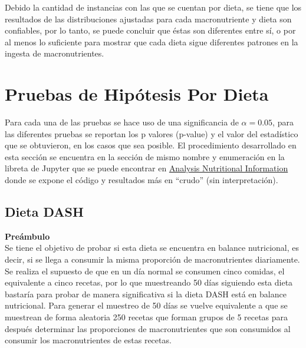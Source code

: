 \documentclass[12pt,a4paper]{article}
\begin{document}
        Debido la cantidad de instancias con las que se cuentan por dieta, se tiene que 
        los resultados de las distribuciones ajustadas para cada macronutriente y dieta 
        son confiables, por lo tanto, se puede concluir que éstas son diferentes entre sí, 
        o por al menos lo suficiente para mostrar que cada dieta sigue diferentes patrones 
        en la ingesta de macronutrientes.

\newpage

\section{Pruebas de Hipótesis Por Dieta}

    Para cada una de las pruebas se hace uso de una significancia de $\alpha = 0.05$, 
    para las diferentes pruebas se reportan los p valores (p-value) y el valor del 
    estadístico que se obtuvieron, en los casos que sea posible. El procedimiento 
    desarrollado en esta sección se encuentra en la sección de mismo nombre y 
    enumeración en la libreta de Jupyter que se puede encontrar en \href{https://github.com/alexisuaguilaru/Analysis_Nutritional_Information/blob/main/Documentation/AlexisAguilar_Reporte.ipynb}{Analysis Nutritional Information} 
    donde se expone el código y resultados más en ``crudo'' (sin interpretación).

    \subsection{Dieta DASH}
        \textbf{Preámbulo}\\
        { 
            Se tiene el objetivo de probar si esta dieta se encuentra 
            en balance nutricional, es decir, si se llega a consumir la 
            misma proporción de macronutrientes diariamente. 
            Se realiza el supuesto de que en un día normal se consumen 
            cinco comidas, el equivalente a cinco recetas, por lo que 
            muestreando 50 días siguiendo esta dieta bastaría 
            para probar de manera significativa si la dieta DASH está en 
            balance nutricional. 
            Para generar el muestreo de 50 días se vuelve equivalente a 
            que se muestrean de forma aleatoria 250 recetas que forman 
            grupos de 5 recetas para después determinar las proporciones 
            de macronutrientes que son consumidos al consumir los macronutrientes 
            de estas recetas.\\
        }
\end{document}
